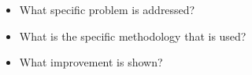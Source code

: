 \begin{itemize}
\item What specific problem is addressed?
\item What is the specific methodology that is used?
\item What improvement is shown?

\end{itemize}






